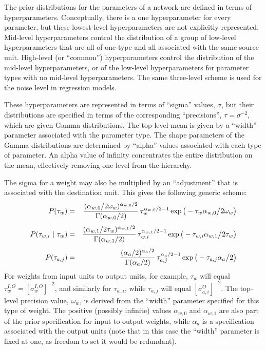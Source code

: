 \documentclass{report}[11pt]
\def\beq{\begin{eqnarray}}
\def\eeq{\end{eqnarray}}
\begin{document}
The prior distributions for the parameters of a network are defined in
terms of hyperparameters.  Conceptually, there is a one hyperparameter
for every parameter, but these lowest-level hyperparameters are not
explicitly represented.  Mid-level hyperparameters control the
distribution of a group of low-level hyperparameters that are all of
one type and all associated with the same source unit.  High-level (or
``common'') hyperparameters control the distribution of the mid-level
hyperparameters, or of the low-level hyperparameters for parameter
types with no mid-level hyperparameters.  The same three-level scheme
is used for the noise level in regression models.

These hyperparameters are represented in terms of ``sigma'' values,
$\sigma$, but their distributions are specified in terms of the
corresponding ``precisions'', $\tau = \sigma^{-2}$, which are given
Gamma distributions.  The top-level mean is given by a ``width''
parameter associated with the parameter type.  The shape parameters of
the Gamma distributions are determined by ``alpha'' values associated
with each type of parameter.  An alpha value of infinity concentrates
the entire distribution on the mean, effectively removing one level
from the hierarchy.

The sigma for a weight may also be multiplied by an ``adjustment'' that
is associated with the destination unit.  This gives the following 
generic scheme:\beq
  P(\tau_w)
   & = & {(\alpha_{w,0}/2\omega_w)^{\alpha_{w,0}/2} 
          \over \Gamma(\alpha_{w,0}/2)}\,
         \tau_w^{\alpha_{w,0}/2-1}
         \exp \big(-\tau_w \alpha_{w,0} \big/ 2 \omega_w\big) \\[3pt]
  P(\tau_{w,i}\ |\ \tau_w)
   & = & {(\alpha_{w,1}/2\tau_w)^{\alpha_{w,1}/2} 
          \over \Gamma(\alpha_{w,1}/2)}\,
         \tau_{w,i}^{\alpha_{w,1}/2-1}
         \exp\big(-\tau_{w,i} \alpha_{w,1} \big/ 2 \tau_w\big) \\[3pt]
  P(\tau_{a,j})
   & = & { (\alpha_a/2)^{\alpha_a/2} \over \Gamma(\alpha_a/2) }\,
         \tau_{a,j}^{\alpha_a/2-1} \exp\big(-\tau_{a,j} \alpha_a \big/ 2\big)
\eeq%
For weights from input units to output units, for example, $\tau_w$
will equal $\tau^{I,O}_w = [\sigma^{I,O}_w]^{-2}$, and similarly for
$\tau_{w,i}$, while $\tau_{a,j}$ will equal $[\sigma^O_{a,i}]^{-2}$.
The top-level precision value, $\omega_w$, is derived from the
``width'' parameter specified for this type of weight. The positive
(possibly infinite) values $\alpha_{w,0}$ and $\alpha_{w,1}$ are
also part of the prior specification for input to output weights,
while $\alpha_a$ is a specification associated with the output units
(note that in this case the ``width'' parameter is fixed at one, as
freedom to set it would be redundant).
\end{document}
